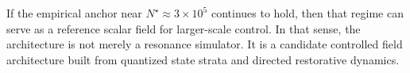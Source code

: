 \documentclass[11pt,a4paper]{article}
\begin{document}
If the empirical anchor near $N^\star \approx 3 \times 10^5$ continues to hold,
then that regime can serve as a reference scalar field for larger-scale control.
In that sense, the architecture is not merely a resonance simulator. It is a
candidate controlled field architecture built from quantized state strata and
directed restorative dynamics.
\end{document}
